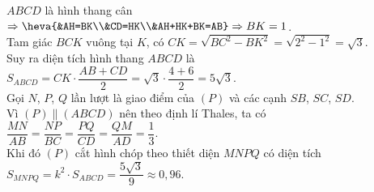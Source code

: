 \begin{ex}
{		$ABCD$ là hình thang cân  $\Rightarrow \heva{&AH=BK\\&CD=HK\\&AH+HK+BK=AB}\Rightarrow BK=1$.\\
		Tam giác $BCK$ vuông tại $K$,  có $CK=\sqrt{B{C^2}-B{K^2}}=\sqrt{2^2-1^2}=\sqrt 3$.\\
		Suy ra diện tích hình thang $ABCD$ là  $S_{ABCD}=CK\cdot \dfrac{AB+CD}{2}=\sqrt 3\cdot \dfrac{4+6}{2}=5\sqrt 3 $.\\
		Gọi $N$, $P$,  $Q$ lần lượt là giao điểm của $(P)$ và các cạnh $SB$, $SC$, $SD$.\\
		 Vì $(P)\parallel \left(ABCD\right)$ nên theo định lí Thales, ta có $\dfrac{MN}{AB}=\dfrac{NP}{BC}=\dfrac{PQ}{CD}=\dfrac{QM}{AD}=\dfrac{1}{3}$.\\
	Khi đó $(P)$ cắt hình chóp theo thiết diện $MNPQ$ có diện  tích $S_{MNPQ}=k^2\cdot S_{ABCD}=\dfrac{5\sqrt 3}{9}\approx 0{,}96$.}
\end{ex}

